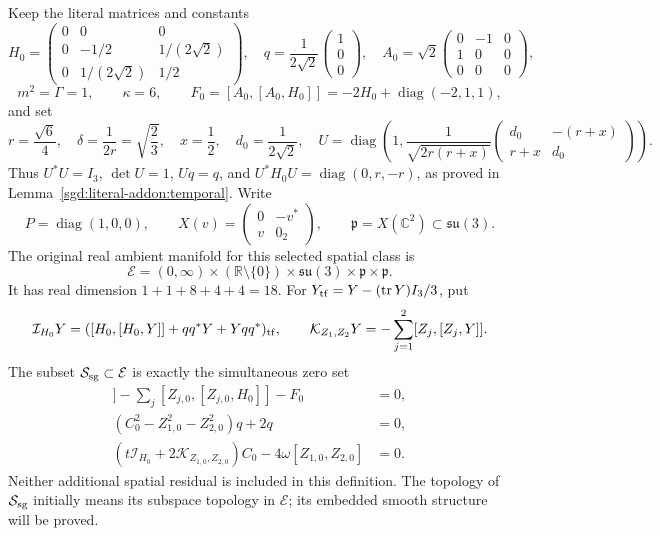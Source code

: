 Keep the literal matrices and constants
\[
 H_0=\begin{pmatrix}0&0&0\\0&-1/2&1/(2\sqrt2)\\
 0&1/(2\sqrt2)&1/2\end{pmatrix},\quad
 q=\frac1{2\sqrt2}\begin{pmatrix}1\\0\\0\end{pmatrix},\quad
 A_0=\sqrt2\begin{pmatrix}0&-1&0\\1&0&0\\0&0&0\end{pmatrix},
\]
\[
 m^2=\Gamma=1,\qquad \kappa=6,\qquad
 F_0=[A_0,[A_0,H_0]]=-2H_0+\operatorname{diag}(-2,1,1),
\]
and set
\[
 r=\frac{\sqrt6}{4},\quad\delta=\frac1{2r}=\sqrt{\frac23},
 \quad x=\frac12,\quad d_0=\frac1{2\sqrt2},\quad
 U=\operatorname{diag}\left(
 1,\frac1{\sqrt{2r(r+x)}}
 \begin{pmatrix}d_0&-(r+x)\\r+x&d_0\end{pmatrix}\right).
\]
Thus $U^*U=I_3$, $\det U=1$, $Uq=q$, and
$U^*H_0U=\operatorname{diag}(0,r,-r)$, as proved in
Lemma~\ref{sgd:literal-addon:temporal}.
Write
\[
 P=\operatorname{diag}(1,0,0),\qquad
 X(v)=\begin{pmatrix}0&-v^*\\v&0_2\end{pmatrix},\qquad
 \mathfrak p=X(\mathbb C^2)\subset\mathfrak{su}(3).
\]
The original real ambient manifold for this selected spatial class is
\[
 \mathcal E=(0,\infty)\times(\mathbb R\setminus\{0\})
             \times\mathfrak{su}(3)\times\mathfrak p\times\mathfrak p.
\]
It has real dimension $1+1+8+4+4=18$.
For $Y_{\rm tf}=Y-(\operatorname{tr}Y)I_3/3$, put
\[
 \mathcal I_{H_0}Y=([H_0,[H_0,Y]]+qq^*Y+Yqq^*)_{\rm tf},
 \qquad \mathcal K_{Z_1,Z_2}Y=-\sum_{j=1}^2[Z_j,[Z_j,Y]].
\]
The subset $\mathcal S_{\rm sg}\subset\mathcal E$ is exactly the
simultaneous zero set
\begin{align*}
 [C_0,[C_0,H_0]]
     -\sum_j[Z_{j,0},[Z_{j,0},H_0]]-F_0&=0,\\
 (C_0^2-Z_{1,0}^2-Z_{2,0}^2)q+2q&=0,\\
 (t\mathcal I_{H_0}+2\mathcal K_{Z_{1,0},Z_{2,0}})C_0
                   -4\omega[Z_{1,0},Z_{2,0}]&=0.
\end{align*}
Neither additional spatial residual is included in this definition.
The topology of $\mathcal S_{\rm sg}$ initially means its subspace
topology in $\mathcal E$; its embedded smooth structure will be proved.

